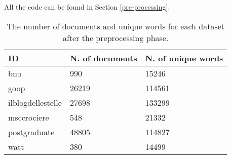 All the code can be found in Section \ref{pre-processing}.

\begin{table}[H]
    \begin{center}
        \begin{tabular}{ |l|l|l| }
            \hline
            ID                & N. of documents & N. of unique words \\
            \hline
            bnu               & 990             & 15246              \\
            \hline
            goop              & 26219           & 114561             \\
            \hline
            ilblogdellestelle & 27698           & 133299             \\
            \hline
            msccrociere       & 548             & 21332              \\
            \hline
            postgraduate      & 48805           & 114827             \\
            \hline
            watt              & 380             & 14499              \\
            \hline
        \end{tabular}
    \end{center}
    \caption{
        The number of documents and unique words for each dataset after the preprocessing phase.
    }
    \label{table:dbprocdata}
\end{table}